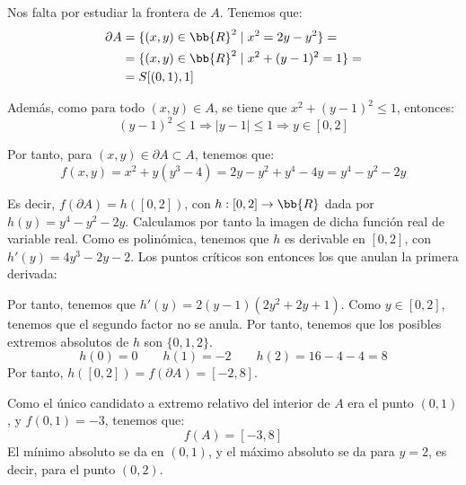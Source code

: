 \begin{ejercicio}
    Nos falta por estudiar la frontera de $A$. Tenemos que:
    \begin{equation*}
        \begin{split}
            \partial A &= \{(x,y)\in \bb{R}^2\mid x^2= 2y-y^2\}
            =\\
            &= \{(x,y)\in \bb{R}^2\mid x^2 + (y-1)^2= 1\} =\\
            &= S[(0,1),1]
        \end{split}
    \end{equation*}

    Además, como para todo $(x,y)\in A$, se tiene que $x^2 + (y-1)^2\leq 1$, entonces:
    \begin{equation*}
        (y-1)^2\leq 1 \Longrightarrow |y-1|\leq 1 \Longrightarrow y\in [0,2]
    \end{equation*}
    
    Por tanto, para $(x,y)\in \partial A\subset A$, tenemos que:
    \begin{equation*}
        f(x,y) = x^2+y(y^3-4) = 2y-y^2 + y^4-4y = y^4-y^2-2y
    \end{equation*}

    Es decir, $f(\partial A)=h([0,2])$, con $h:[0,2]\to \bb{R}$ dada por $h(y)=y^4-y^2-2y$. Calculamos por tanto la imagen de dicha función real de variable real. Como es polinómica, tenemos que $h$ es derivable en $[0,2]$, con $h'(y)=4y^3-2y-2$. Los puntos críticos son entonces los que anulan la primera derivada:
    \begin{figure}[H]
        \centering
    \end{figure}
    Por tanto, tenemos que $h'(y)=2(y-1)(2y^2+2y+1)$. Como $y\in [0,2]$, tenemos que el segundo factor no se anula. Por tanto, tenemos que los posibles extremos absolutos de $h$ son $\{0,1,2\}$.
    \begin{equation*}
        h(0)=0 \qquad h(1)=-2 \qquad h(2)=16-4-4 = 8
    \end{equation*}
    Por tanto, $h([0,2])=f(\partial A) = [-2,8]$.

    Como el único candidato a extremo relativo del interior de $A$ era el punto $(0,1)$, y $f(0,1)=-3$, tenemos que:
    \begin{equation*}
        f(A)=[-3,8]
    \end{equation*}
    El mínimo absoluto se da en $(0,1)$, y el máximo absoluto se da para $y=2$, es decir, para el punto $(0,2)$.
\end{ejercicio}








